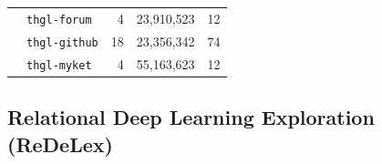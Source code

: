 \documentclass{article} %
\begin{document}
\begin{table}[t]
\begin{tabular}{llrrr}
      & \texttt{thgl-forum}    & 4  & 23,910,523  & 12 \\                                                                                                                                                                                                    
      & \texttt{thgl-github}   & 18 & 23,356,342  & 74 \\                                                                                                                                                                                                    
      & \texttt{thgl-myket}    & 4  & 55,163,623  & 12 \\                                                                                                                                                                                                    
      \bottomrule                                                                                                                                                                                                                                            
    \end{tabular}                                                                                                                                                                                                                                       
    \endgroup                                                                                                                                                                                                                            
    \vspace{-10pt}                                                                                                                                                                                                                                           
\end{table}                                                                                                                                                                  

\subsection{Relational Deep Learning Exploration (ReDeLex)} \label{sec:redelex}
\end{document}
